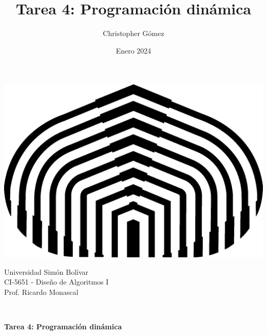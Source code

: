 \documentclass[letterpaper, 12pt]{article}
\title{Tarea 4: Programación dinámica}
\author{Christopher Gómez}
\date{Enero 2024}
\begin{document}
\parbox[t]{.5\linewidth}{
    \centering
    \includegraphics[scale=0.4]{logo.png}
    \begin{center}
        Universidad Simón Bolívar \\
        CI-5651 - Diseño de Algoritmos I \\
        Prof. Ricardo Monascal \\
    \end{center}
}
\hfill {}

\phantom{This text will be invisible} \\
\centerline {\textbf{Tarea 4: Programación dinámica}}
\justify
\end{document}

